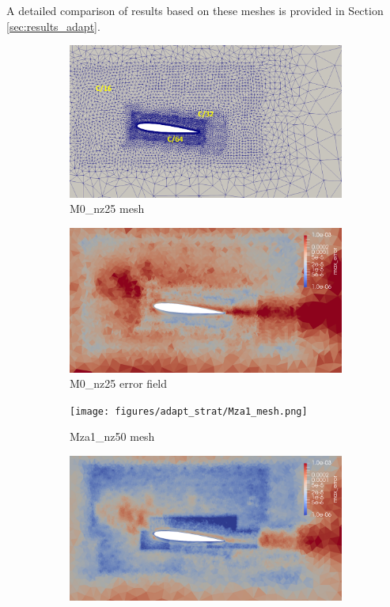 A detailed comparison of results based on these meshes is provided in Section \ref{sec:results_adapt}.

\begin{figure}[H]
\centering
\begin{subfigure}[b]{0.475\textwidth}
\centering
\includegraphics[width=1\textwidth]{figures/adapt_strat/M0_mesh.png}
\caption{M0\_nz25 mesh}
\label{fig:M0_mesh}
\end{subfigure}
\begin{subfigure}[b]{0.475\textwidth}
\centering
\includegraphics[width=1\textwidth]{figures/adapt_strat/M0_error.png}
\caption{M0\_nz25 error field}
\label{fig:M0_err_plot}
\end{subfigure}
\begin{subfigure}[b]{0.475\textwidth}
\centering
\texttt{[image: figures/adapt\_strat/Mza1\_mesh.png]}
\caption{Mza1\_nz50 mesh}
\label{fig:Mza1_mesh}
\end{subfigure}
\begin{subfigure}[b]{0.475\textwidth}
\centering
\includegraphics[width=1\textwidth]{figures/adapt_strat/Mza1_error.png}

\end{subfigure}
\end{figure}
